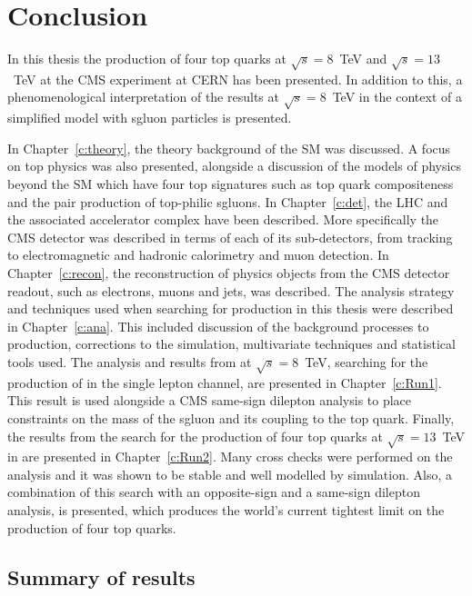 \chapter{Conclusion}
\label{c:DandC}

In this thesis the production of four top quarks at $\sqrt{s}=8$~TeV and $\sqrt{s}=13$~TeV at the CMS experiment at CERN has been presented. In addition to this, a phenomenological interpretation of the results at $\sqrt{s}=8$~TeV in the context of a simplified model with sgluon particles is presented.

In Chapter~\ref{c:theory}, the theory background of the SM was discussed. A focus on top physics was also presented, alongside a discussion of the models of physics beyond the SM which have four top signatures such as top quark compositeness and the pair production of top-philic sgluons. 
In Chapter~\ref{c:det}, the LHC and the associated accelerator complex have been described. More specifically the CMS detector was described in terms of each of its sub-detectors, from tracking to electromagnetic and hadronic calorimetry and muon detection.
In Chapter~\ref{c:recon}, the reconstruction of physics objects from the CMS detector readout, such as electrons, muons and jets, was described.
The analysis strategy and techniques used when searching for \tttt production in this thesis were described in Chapter~\ref{c:ana}. This included discussion of the background processes to \tttt production, corrections to the simulation, multivariate techniques and statistical tools used.
The analysis and results from \runone at $\sqrt{s}=8$~TeV, searching for the production of \tttt in the single lepton channel, are presented in Chapter~\ref{c:Run1}. This result is used alongside a CMS same-sign dilepton analysis to place constraints on the mass of the sgluon and its coupling to the top quark.
Finally, the results from the search for the production of four top quarks at $\sqrt{s}=13$~TeV in \runtwo are presented in Chapter~\ref{c:Run2}. Many cross checks were performed on the analysis and it was shown to be stable and well modelled by simulation. Also, a combination of this search with an opposite-sign and a same-sign dilepton analysis, is presented, which produces the world's current tightest limit on the production of four top quarks.

\section{Summary of results}

